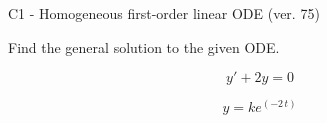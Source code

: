 \begin{exercise}
  \begin{exerciseTitle}C1 - Homogeneous first-order linear ODE (ver. 75)\end{exerciseTitle}
  \begin{exerciseStatement}
    
Find the general solution to the given ODE.

    
\[y'+2y=0\]

  \end{exerciseStatement}
  \begin{exerciseAnswer}
    
\[y= k e^{\left(-2 \, t\right)}\]

  \end{exerciseAnswer}
\end{exercise}